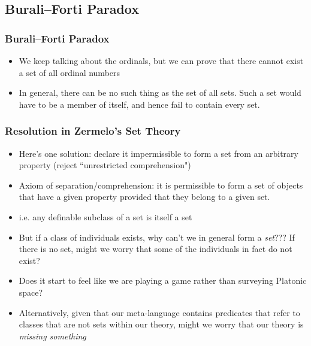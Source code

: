 \subsection{Burali--Forti Paradox}

\begin{frame}
\frametitle{Burali--Forti Paradox}

\begin{itemize}[<+->]

\item We keep talking about the ordinals, but we can prove that there cannot exist a set of all ordinal numbers

\item In general, there can be no such thing as the set of all sets. Such a set would have to be a member of itself, and hence fail to contain every set.


\end{itemize}
\end{frame}

\begin{frame}
\frametitle{Resolution in Zermelo's Set Theory}

\begin{itemize}[<+->]

\item Here's one solution: declare it impermissible to form a set from an arbitrary property (reject ``unrestricted comprehension")

\item Axiom of separation/comprehension: it is permissible to form a set of objects that have a given property provided that they belong to a given set. 

\item i.e. any definable subclass of a set is itself a set 

\item But if a class of individuals exists, why can't we in general form a \textit{set}??? If there is no set, might we worry that some of the individuals in fact do not exist?

\item Does it start to feel like we are playing a game rather than surveying Platonic space?

\item Alternatively, given that our meta-language contains predicates that refer to classes that are not sets within our theory, might we worry that our theory is \textit{missing something}


\end{itemize}
\end{frame}




